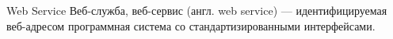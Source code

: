 \begin{frame}{Web Service}
Веб-служба, веб-сервис (англ. web service) — идентифицируемая веб-адресом программная система со стандартизированными интерфейсами.
\end{frame}
